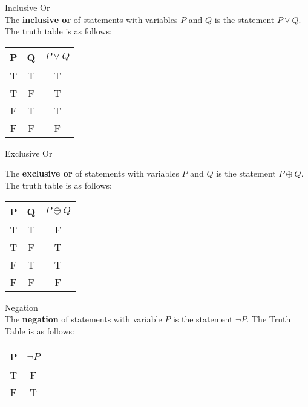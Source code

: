 \begin{definition}
Inclusive Or \\

The {\bf inclusive or} of statements with variables $P$ and $Q$ is the statement $P \vee Q$. The truth table is as follows: \\
\begin{center}
\begin{tabular}{|c|c|c|}
\hline 
P & Q & $P \vee Q$ \\ 
\hline 
T & T & T \\ 
\hline 
T & F & T \\ 
\hline 
F & T & T \\ 
\hline 
F & F & F \\ 
\hline 
\end{tabular} 
\end{center}
\end{definition}

\begin{definition}
Exclusive Or

The {\bf exclusive or} of statements with variables $P$ and $Q$ is the statement $P \oplus Q$. The truth table is as follows: \\
\begin{center}
\begin{tabular}{|c|c|c|}
\hline 
P & Q & $P \oplus Q$ \\ 
\hline 
T & T & F \\ 
\hline 
T & F & T \\ 
\hline 
F & T & T \\ 
\hline 
F & F & F \\ 
\hline 
\end{tabular} 
\end{center}
\end{definition}


\begin{definition}
Negation \\

The {\bf negation} of statements with variable $P$ is the statement $\neg P$. The Truth Table is as follows: \\
\begin{center}
\begin{tabular}{|c|c|c|}
\hline 
P & $\neg P$ \\ 
\hline 
T & F \\ 
\hline 
F & T \\ 
\hline 
\end{tabular} 
\end{center}
\end{definition}


